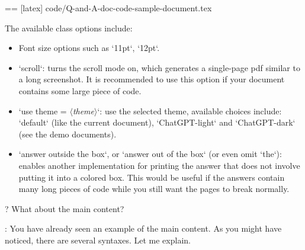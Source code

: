 \documentclass[%
  use style = classical,
  scroll,
]{Q-and-A}
\newcommand{\meta}[1]{$\langle${\normalfont\itshape#1}$\rangle$}
\begin{document}
  == [latex] {code/Q-and-A-doc-code-sample-document.tex}

  The available class options include:
  \begin{itemize}
    \item Font size options such as `11pt`, `12pt`.
    \item `scroll`: turns the scroll mode on, which generates a single-page pdf similar to a long screenshot. It is recommended to use this option if your document contains some large piece of code.
    \item `use theme = \meta{theme}`: use the selected theme, available choices include: `default` (like the current document), `ChatGPT-light` and `ChatGPT-dark` (see the demo documents).
    \item `answer outside the box`, or `answer out of the box` (or even omit `the`): enables another implementation for printing the answer that does not involve putting it into a colored box. This would be useful if the answers contain many long pieces of code while you still want the pages to break normally.
  \end{itemize}

?
  What about the main content?

:
  You have already seen an example of the main content. As you might have noticed, there are several syntaxes. Let me explain.
\end{document}
